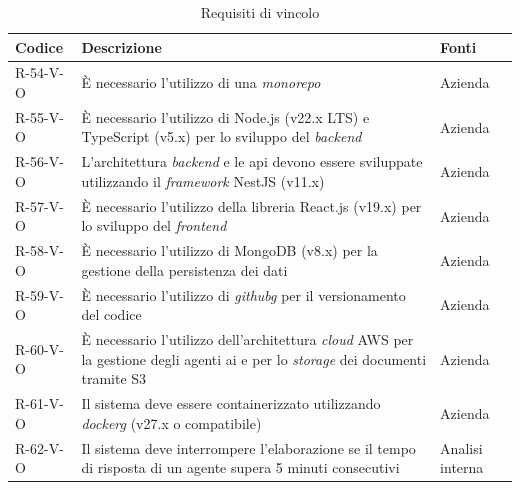 \begin{table}[h]
\centering
\caption{Requisiti di vincolo}
\label{tab:requisiti-vincolo}
\begin{tabularx}{\textwidth}{lXl}
\hline\hline
\textbf{Codice} & \textbf{Descrizione} & \textbf{Fonti} \\
\hline
R-54-V-O & È necessario l'utilizzo di una \emph{monorepo} & Azienda \\
\hline
R-55-V-O & È necessario l'utilizzo di Node.js (v22.x LTS) e TypeScript (v5.x) per lo sviluppo del \emph{backend} & Azienda \\
\hline
R-56-V-O & L'architettura \emph{backend} e le \gls{api} devono essere sviluppate utilizzando il \emph{framework} NestJS (v11.x) & Azienda \\
\hline
R-57-V-O & È necessario l'utilizzo della libreria React.js (v19.x) per lo sviluppo del \emph{frontend} & Azienda \\
\hline
R-58-V-O & È necessario l'utilizzo di MongoDB (v8.x) per la gestione della persistenza dei dati & Azienda \\
\hline
R-59-V-O & È necessario l'utilizzo di \emph{\gls{githubg}} per il versionamento del codice & Azienda \\
\hline
R-60-V-O & È necessario l'utilizzo dell'architettura \emph{cloud} AWS per la gestione degli agenti ai e per lo \emph{storage} dei documenti tramite S3 & Azienda \\
\hline
R-61-V-O & Il sistema deve essere containerizzato utilizzando \emph{\gls{dockerg}} (v27.x o compatibile) & Azienda \\
\hline
R-62-V-O & Il sistema deve interrompere l'elaborazione se il tempo di risposta di un agente supera 5 minuti consecutivi & Analisi interna \\
\hline

\end{tabularx}
\end{table}
